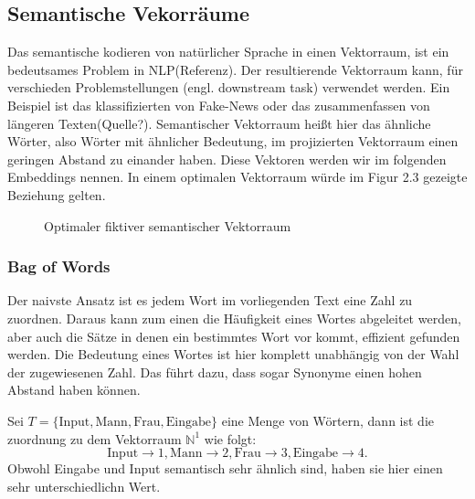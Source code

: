 \documentclass[12pt,letterpaper,ngerman]{article}
\begin{document}
\subsection{Semantische Vekorräume}
Das semantische kodieren von natürlicher Sprache in einen Vektorraum,
ist ein bedeutsames Problem in NLP(Referenz). Der resultierende 
Vektorraum kann, für verschieden Problemstellungen 
(engl. downstream task) verwendet werden. Ein Beispiel
ist das klassifizierten von Fake-News oder das zusammenfassen
von längeren Texten(Quelle?). Semantischer Vektorraum heißt hier
das ähnliche Wörter, also Wörter mit ähnlicher Bedeutung, im 
projizierten Vektorraum einen geringen Abstand zu einander haben.
Diese Vektoren werden wir im folgenden Embeddings nennen.
In einem optimalen Vektorraum würde im Figur 2.3 gezeigte Beziehung
gelten.
\begin{figure}[H]
  \begin{center}
  \end{center}
  \caption{Optimaler fiktiver semantischer Vektorraum}
\end{figure}
\subsubsection{Bag of Words}
Der naivste Ansatz ist es jedem Wort im vorliegenden Text eine 
Zahl zu zuordnen. Daraus kann zum einen die Häufigkeit eines Wortes
abgeleitet werden, aber auch die Sätze in denen ein bestimmtes Wort
vor kommt, effizient gefunden werden. Die Bedeutung eines Wortes ist
hier komplett unabhängig von der Wahl der zugewiesenen Zahl. Das führt
dazu, dass sogar Synonyme einen hohen Abstand haben können.
\begin{example}
  Sei $T = \{\text{Input}, \text{Mann}, \text{Frau},
   \text{Eingabe}\}$ eine Menge von Wörtern, dann ist die zuordnung
  zu dem Vektorraum $\mathbb{N}^1$ wie folgt:
  \[
    \text{Input} \to 1, 
    \text{Mann} \to 2, 
    \text{Frau} \to 3,
    \text{Eingabe} \to 4.
  \]
  Obwohl Eingabe und Input semantisch sehr ähnlich sind, haben sie hier
  einen sehr unterschiedlichn Wert.
\end{example}
\end{document}

